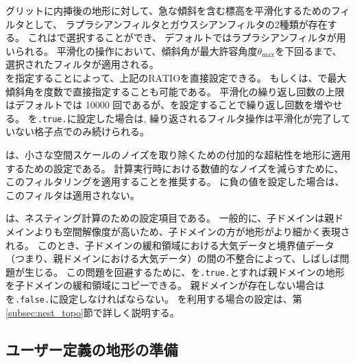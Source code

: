 \scale グリットに内挿後の地形に対して、急な傾斜を含む標高を平滑化するためのフィルタとして、
ラプラシアンフィルタとガウスシアンフィルタの2種類が存在する。
これはで選択することができ、
デフォルトではラプラシアンフィルタが用いられる。
平滑化の操作において、傾斜角が最大許容角度$\theta_{\max}$を下回るまで、選択されたフィルタが適用される。\\
を指定することによって、上記の$\mathrm{RATIO}$を直接設定できる。
もしくは、で最大傾斜角を度数で直接指定することも可能である。
平滑化の繰り返し回数の上限はデフォルトでは 10000 回であるが、を設定することで繰り返し回数を増やせる。
を\verb|.true.|に設定した場合は, 繰り返されるフィルタ操作は平滑化が完了していない格子点でのみ続けられる。

は、小さな空間スケールのノイズを取り除くための付加的な超粘性を地形に適用するための設定である。
計算実行時における数値的なノイズを減らすために、このフィルタリングを適用することを推奨する。
に負の値を設定した場合は、このフィルタは適用されない。

は、ネスティング計算のための設定項目である。
一般的に、子ドメインは親ドメインよりも空間解像度が高いため、子ドメインの方が地形がより細かく表現される。
このとき、子ドメインの緩和領域における大気データと境界値データ（つまり、親ドメインにおける大気データ）の間の不整合によって、しばしば問題が生じる。
この問題を回避するために、を\verb|.true.|とすれば親ドメインの地形を子ドメインの緩和領域にコピーできる。
親ドメインが存在しない場合はを\verb|.false.|に設定しなければならない。
を利用する場合の設定は、第\ref{subsec:nest_topo}節で詳しく説明する。


\subsection{ユーザー定義の地形の準備} \label{subsec:topo_userfile}

